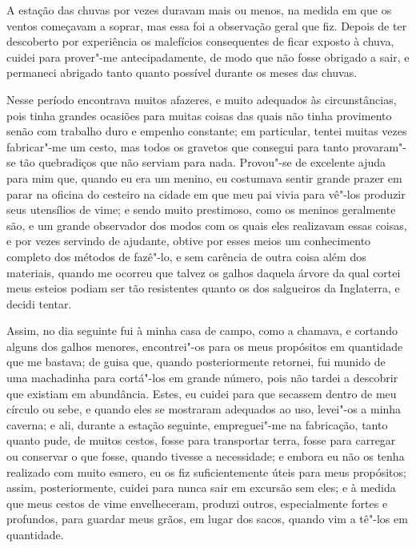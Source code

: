 \medskip

A estação das chuvas por vezes duravam mais ou menos, na medida em que
os ventos começavam a soprar, mas essa foi a observação geral que fiz.
Depois de ter descoberto por experiência os malefícios consequentes de
ficar exposto à chuva, cuidei para prover"-me antecipadamente, de modo
que não fosse obrigado a sair, e permaneci abrigado tanto quanto
possível durante os meses das chuvas.

Nesse período encontrava muitos afazeres, e muito adequados às
circunstâncias, pois tinha grandes ocasiões para muitas coisas das quais
não tinha provimento senão com trabalho duro e empenho constante; em
particular, tentei muitas vezes fabricar"-me um cesto, mas todos os
gravetos que consegui para tanto provaram"-se tão quebradiços que não
serviam para nada. Provou"-se de excelente ajuda para mim que, quando eu
era um menino, eu costumava sentir grande prazer em parar na oficina do
cesteiro na cidade em que meu pai vivia para vê"-los produzir seus
utensílios de vime; e sendo muito prestimoso, como os meninos geralmente
são, e um grande observador dos modos com os quais eles realizavam essas
coisas, e por vezes servindo de ajudante, obtive por esses meios um
conhecimento completo dos métodos de fazê"-lo, e sem carência de outra
coisa além dos materiais, quando me ocorreu que talvez os galhos daquela
árvore da qual cortei meus esteios podiam ser tão resistentes quanto os
dos salgueiros da Inglaterra, e decidi tentar.

Assim, no dia seguinte fui à minha casa de campo, como a chamava, e
cortando alguns dos galhos menores, encontrei"-os para os meus propósitos
em quantidade que me bastava; de guisa que, quando posteriormente
retornei, fui munido de uma machadinha para cortá"-los em grande número,
pois não tardei a descobrir que existiam em abundância. Estes, eu cuidei
para que secassem dentro de meu círculo ou sebe, e quando eles se
mostraram adequados ao uso, levei"-os a minha caverna; e ali, durante a
estação seguinte, empreguei"-me na fabricação, tanto quanto pude, de
muitos cestos, fosse para transportar terra, fosse para carregar ou
conservar o que fosse, quando tivesse a necessidade; e embora eu não os
tenha realizado com muito esmero, eu os fiz suficientemente úteis para
meus propósitos; assim, posteriormente, cuidei para nunca sair em
excursão sem eles; e à medida que meus cestos de vime envelheceram,
produzi outros, especialmente fortes e profundos, para guardar meus
grãos, em lugar dos sacos, quando vim a tê"-los em quantidade.

